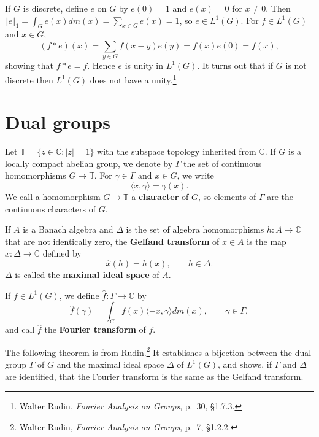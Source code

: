 \documentclass{article}
\newcommand{\inner}[2]{\langle #1, #2 \rangle}
\newcommand{\norm}[1]{\Vert #1 \Vert}
\begin{document}
If $G$ is discrete, define $e$ on $G$ by $e(0)=1$ and $e(x)=0$ for $x \neq 0$. Then $\norm{e}_1 = \int_G e(x) dm(x) = \sum_{x \in G} e(x)=1$, so
$e \in L^1(G)$. For $f \in L^1(G)$ and $x \in G$,
\[
(f*e)(x) = \sum_{y \in G} f(x-y)e(y) = f(x)e(0)=f(x),
\]
showing that $f*e=f$. Hence $e$ is unity in $L^1(G)$.  It turns out that if $G$ is not discrete then $L^1(G)$ does not have a unity.\footnote{Walter
Rudin, {\em Fourier Analysis on Groups}, p.~30, \S 1.7.3.}


\section{Dual groups}
Let $\mathbb{T}=\{z \in \mathbb{C}: |z| =1\}$ with the subspace topology inherited from $\mathbb{C}$. If $G$ is a locally compact abelian group, we denote by
$\Gamma$ the set of continuous homomorphisms $G \to \mathbb{T}$. For $\gamma \in \Gamma$ and $x \in G$, we write
\[
\inner{x}{\gamma} = \gamma(x).
\]
We call a homomorphism $G \to \mathbb{T}$ a \textbf{character} of $G$, so elements of $\Gamma$ are the continuous characters of $G$.

If $A$ is a Banach algebra and $\Delta$ is the set of algebra homomorphisms $h:A \to \mathbb{C}$ that are not identically zero,
the \textbf{Gelfand transform} of $x \in A$ is the map $\hat{x}:\Delta \to \mathbb{C}$ defined by
\[
\hat{x}(h)=h(x), \qquad h \in \Delta.
\]
$\Delta$ is called the \textbf{maximal ideal space} of $A$. 


If $f \in L^1(G)$, we define $\hat{f}:\Gamma \to \mathbb{C}$ by
\[
\hat{f}(\gamma) = \int_G f(x) \inner{-x}{\gamma} dm(x), \qquad \gamma \in \Gamma,
\]
and call $\hat{f}$ the \textbf{Fourier transform} of $f$. 

The following theorem 
is from Rudin.\footnote{Walter Rudin, {\em Fourier Analysis on Groups}, p.~7, \S 1.2.2.} It establishes a bijection between the dual
group $\Gamma$  of $G$ and the maximal ideal space $\Delta$
of $L^1(G)$, and shows, if $\Gamma$ and $\Delta$ are identified, that the Fourier transform is the same as the Gelfand transform. 
\end{document}
